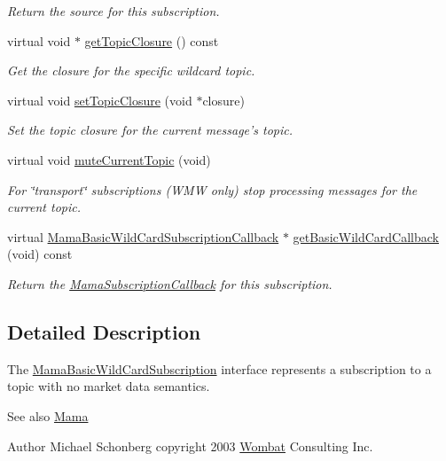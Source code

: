 \begin{DoxyCompactItemize}
\begin{DoxyCompactList}\small\item\em Return the source for this subscription. \item\end{DoxyCompactList}\item 
virtual void $\ast$ \hyperlink{classWombat_1_1MamaBasicWildCardSubscription_abe5fcf14f1a436a58da30c79a825aa63}{getTopicClosure} () const 
\begin{DoxyCompactList}\small\item\em Get the closure for the specific wildcard topic. \item\end{DoxyCompactList}\item 
virtual void \hyperlink{classWombat_1_1MamaBasicWildCardSubscription_af039fe8b841712d13e0740589c9cba45}{setTopicClosure} (void $\ast$closure)
\begin{DoxyCompactList}\small\item\em Set the topic closure for the current message's topic. \item\end{DoxyCompactList}\item 
virtual void \hyperlink{classWombat_1_1MamaBasicWildCardSubscription_a7f2a0d630890db350db7dac440a07bc8}{muteCurrentTopic} (void)
\begin{DoxyCompactList}\small\item\em For \char`\"{}transport\char`\"{} subscriptions (WMW only) stop processing messages for the current topic. \item\end{DoxyCompactList}\item 
virtual \hyperlink{classWombat_1_1MamaBasicWildCardSubscriptionCallback}{MamaBasicWildCardSubscriptionCallback} $\ast$ \hyperlink{classWombat_1_1MamaBasicWildCardSubscription_ae4735aabe82c2b92741aaf24ade99a46}{getBasicWildCardCallback} (void) const 
\begin{DoxyCompactList}\small\item\em Return the {\ttfamily \hyperlink{classWombat_1_1MamaSubscriptionCallback}{MamaSubscriptionCallback}} for this subscription. \item\end{DoxyCompactList}\end{DoxyCompactItemize}


\subsection{Detailed Description}
The {\ttfamily \hyperlink{classWombat_1_1MamaBasicWildCardSubscription}{MamaBasicWildCardSubscription}} interface represents a subscription to a topic with no market data semantics. \begin{DoxySeeAlso}{See also}
\hyperlink{classWombat_1_1Mama}{Mama} 
\end{DoxySeeAlso}
\begin{DoxyAuthor}{Author}
Michael Schonberg copyright 2003 \hyperlink{namespaceWombat}{Wombat} Consulting Inc. 
\end{DoxyAuthor}


